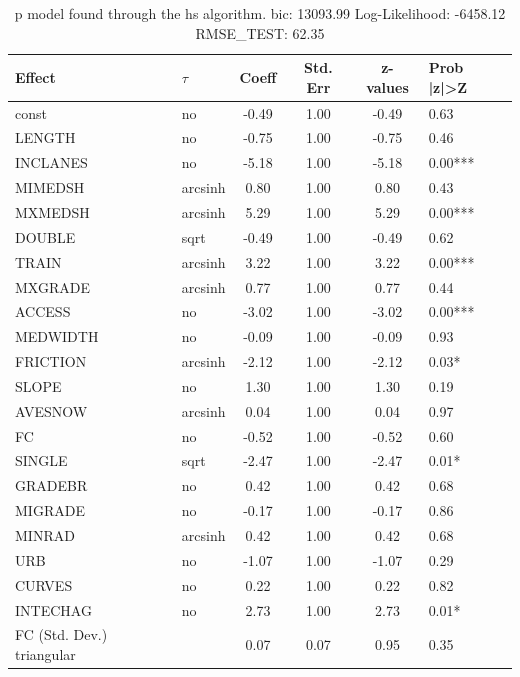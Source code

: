 \begin{table}
	\caption{p model found through the hs algorithm. bic: 13093.99 Log-Likelihood: -6458.12 RMSE_TEST: 62.35}
	\begin{center}
		\begin{tabular}{|l|l|c|c|c|l|}
			\hline
			Effect & $\tau$ & Coeff & Std. Err & z-values & Prob |z|>Z \\
			\hline
			const & no & -0.49 & 1.00 & -0.49 & 0.63 \\
			\hline
			LENGTH & no & -0.75 & 1.00 & -0.75 & 0.46 \\
			\hline
			INCLANES & no & -5.18 & 1.00 & -5.18 & 0.00*** \\
			\hline
			MIMEDSH & arcsinh & 0.80 & 1.00 & 0.80 & 0.43 \\
			\hline
			MXMEDSH & arcsinh & 5.29 & 1.00 & 5.29 & 0.00*** \\
			\hline
			DOUBLE & sqrt & -0.49 & 1.00 & -0.49 & 0.62 \\
			\hline
			TRAIN & arcsinh & 3.22 & 1.00 & 3.22 & 0.00*** \\
			\hline
			MXGRADE & arcsinh & 0.77 & 1.00 & 0.77 & 0.44 \\
			\hline
			ACCESS & no & -3.02 & 1.00 & -3.02 & 0.00*** \\
			\hline
			MEDWIDTH & no & -0.09 & 1.00 & -0.09 & 0.93 \\
			\hline
			FRICTION & arcsinh & -2.12 & 1.00 & -2.12 & 0.03* \\
			\hline
			SLOPE & no & 1.30 & 1.00 & 1.30 & 0.19 \\
			\hline
			AVESNOW & arcsinh & 0.04 & 1.00 & 0.04 & 0.97 \\
			\hline
			FC & no & -0.52 & 1.00 & -0.52 & 0.60 \\
			\hline
			SINGLE & sqrt & -2.47 & 1.00 & -2.47 & 0.01* \\
			\hline
			GRADEBR & no & 0.42 & 1.00 & 0.42 & 0.68 \\
			\hline
			MIGRADE & no & -0.17 & 1.00 & -0.17 & 0.86 \\
			\hline
			MINRAD & arcsinh & 0.42 & 1.00 & 0.42 & 0.68 \\
			\hline
			URB & no & -1.07 & 1.00 & -1.07 & 0.29 \\
			\hline
			CURVES & no & 0.22 & 1.00 & 0.22 & 0.82 \\
			\hline
			INTECHAG & no & 2.73 & 1.00 & 2.73 & 0.01* \\
			\hline
			FC (Std. Dev.) triangular &  & 0.07 & 0.07 & 0.95 & 0.35 \\

\end{tabular}
\end{center}
\end{table}
